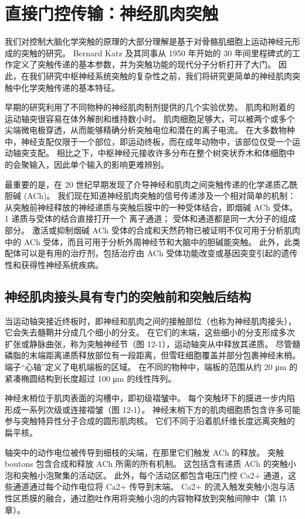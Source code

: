 \chapter{直接门控传输：神经肌肉突触}

我们对控制大脑化学突触的原理的大部分理解是基于对骨骼肌细胞上运动神经元形成的突触的研究。 Bernard Katz 及其同事从 1950 年开始的 30 年间里程碑式的工作定义了突触传递的基本参数，并为突触功能的现代分子分析打开了大门。 因此，在我们研究中枢神经系统突触的复杂性之前，我们将研究更简单的神经肌肉突触中化学突触传递的基本特征。

早期的研究利用了不同物种的神经肌肉制剂提供的几个实验优势。 肌肉和附着的运动轴突很容易在体外解剖和维持数小时。 肌肉细胞足够大，可以被两个或多个尖端微电极穿透，从而能够精确分析突触电位和潜在的离子电流。 在大多数物种中，神经支配仅限于一个部位，即运动终板，而在成年动物中，该部位仅受一个运动轴突支配。 相比之下，中枢神经元接收许多分布在整个树突状乔木和体细胞中的会聚输入，因此单个输入的影响更难辨别。

最重要的是，在 20 世纪早期发现了介导神经和肌肉之间突触传递的化学递质乙酰胆碱 (ACh)。 我们现在知道神经肌肉突触的信号传递涉及一个相对简单的机制：从突触前神经释放的神经递质与突触后膜中的一种受体结合，即烟碱 ACh 受体。1 递质与受体的结合直接打开一个 离子通道； 受体和通道都是同一大分子的组成部分。 激活或抑制烟碱 ACh 受体的合成和天然药物已被证明不仅可用于分析肌肉中的 ACh 受体，而且可用于分析外周神经节和大脑中的胆碱能突触。 此外，此类配体可以是有用的治疗剂，包括治疗由 ACh 受体功能改变或基因突变引起的遗传性和获得性神经系统疾病。

\section{神经肌肉接头具有专门的突触前和突触后结构}
当运动轴突接近终板时，即神经和肌肉之间的接触部位（也称为神经肌肉接头），它会失去髓鞘并分成几个细小的分支。 在它们的末端，这些细小的分支形成多次扩张或静脉曲张，称为突触神经节（图 12-1），运动轴突从中释放其递质。 尽管髓磷脂的末端距离递质释放部位有一段距离，但雪旺细胞覆盖并部分包裹神经末梢。 端子“心轴”定义了电机端板的区域。 在不同的物种中，端板的范围从约 20 μm 的紧凑椭圆结构到长度超过 100 μm 的线性阵列。

神经末梢位于肌肉表面的沟槽中，即初级褶皱中。 每个突触环下的膜进一步内陷形成一系列次级或连接褶皱（图 12-1）。 神经末梢下方的肌肉细胞质包含许多可能参与突触特异性分子合成的圆形肌肉核。 它们不同于沿着肌纤维长度远离突触的扁平核。

轴突中的动作电位被传导到细枝的尖端，在那里它们触发 ACh 的释放。 突触 boutons 包含合成和释放 ACh 所需的所有机制。 这包括含有递质 ACh 的突触小泡和突触小泡聚集的活动区。 此外，每个活动区都包含电压门控 Ca2+ 通道，这些通道通过每个动作电位将 Ca2+ 传导到末端。 Ca2+ 的流入触发突触小泡与活性区质膜的融合，通过胞吐作用将突触小泡的内容物释放到突触间隙中（第 15 章）。


